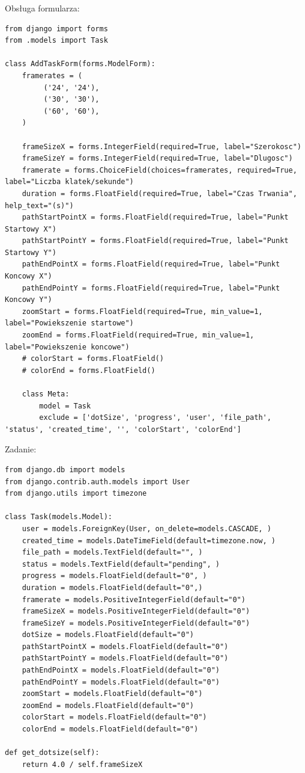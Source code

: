 \documentclass[a4paper]{article}
\begin{document}
Obsługa formularza:
\begin{lstlisting}
from django import forms
from .models import Task

class AddTaskForm(forms.ModelForm):
    framerates = (
         ('24', '24'),
         ('30', '30'),
         ('60', '60'),
    )

    frameSizeX = forms.IntegerField(required=True, label="Szerokosc")
    frameSizeY = forms.IntegerField(required=True, label="Dlugosc")
    framerate = forms.ChoiceField(choices=framerates, required=True, label="Liczba klatek/sekunde")
    duration = forms.FloatField(required=True, label="Czas Trwania", help_text="(s)")
    pathStartPointX = forms.FloatField(required=True, label="Punkt Startowy X")
    pathStartPointY = forms.FloatField(required=True, label="Punkt Startowy Y")
    pathEndPointX = forms.FloatField(required=True, label="Punkt Koncowy X")
    pathEndPointY = forms.FloatField(required=True, label="Punkt Koncowy Y")
    zoomStart = forms.FloatField(required=True, min_value=1, label="Powiekszenie startowe")
    zoomEnd = forms.FloatField(required=True, min_value=1, label="Powiekszenie koncowe")
    # colorStart = forms.FloatField()
    # colorEnd = forms.FloatField()

    class Meta:
        model = Task
        exclude = ['dotSize', 'progress', 'user', 'file_path', 'status', 'created_time', '', 'colorStart', 'colorEnd']
\end{lstlisting}

Zadanie:
\begin{lstlisting}
from django.db import models
from django.contrib.auth.models import User
from django.utils import timezone

class Task(models.Model):
    user = models.ForeignKey(User, on_delete=models.CASCADE, )
    created_time = models.DateTimeField(default=timezone.now, )
    file_path = models.TextField(default="", )
    status = models.TextField(default="pending", )
    progress = models.FloatField(default="0", )
    duration = models.FloatField(default="0",)
    framerate = models.PositiveIntegerField(default="0")
    frameSizeX = models.PositiveIntegerField(default="0")
    frameSizeY = models.PositiveIntegerField(default="0")
    dotSize = models.FloatField(default="0")
    pathStartPointX = models.FloatField(default="0")
    pathStartPointY = models.FloatField(default="0")
    pathEndPointX = models.FloatField(default="0")
    pathEndPointY = models.FloatField(default="0")
    zoomStart = models.FloatField(default="0")
    zoomEnd = models.FloatField(default="0")
    colorStart = models.FloatField(default="0")
    colorEnd = models.FloatField(default="0")

def get_dotsize(self):
    return 4.0 / self.frameSizeX
\end{lstlisting}
\end{document}
